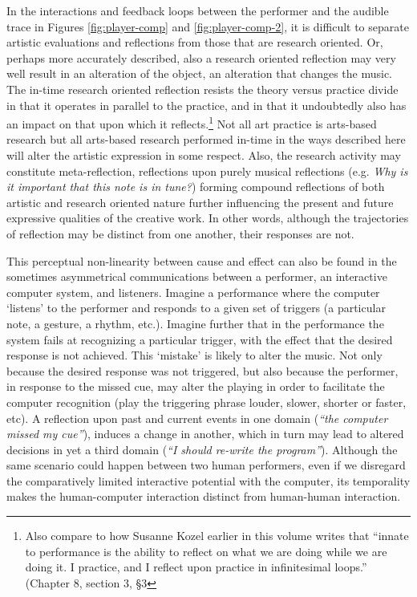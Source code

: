 In the interactions and feedback loops between the performer and the audible trace in Figures \ref{fig:player-comp} and \ref{fig:player-comp-2}, it is difficult to separate artistic evaluations and reflections from those that are research oriented. Or, perhaps more accurately described, also a research oriented reflection may very well result in an alteration of the object, an alteration that changes the music. The in-time research oriented reflection resists the theory versus practice divide in that it operates in parallel to the practice, and in that it undoubtedly also has an impact on that upon which it reflects.\footnote{Also compare to how Susanne Kozel earlier in this volume writes that ``innate to performance is the ability to reflect on what we are doing while we are doing it. I practice, and I reflect upon practice in infinitesimal loops.'' (Chapter 8, section 3, \S3} Not all art practice is arts-based research but all arts-based research performed in-time in the ways described here will alter the artistic expression in some respect. Also, the research activity may constitute meta-reflection, reflections upon purely musical reflections (e.g. \emph{Why is it important that this note is in tune?}) forming compound reflections of both artistic and research oriented nature further influencing the present and future expressive qualities of the creative work. In other words, although the trajectories of reflection may be distinct from one another, their responses are not. 

This perceptual non-linearity between cause and effect can also be found in the sometimes asymmetrical communications between a performer, an interactive computer system, and listeners. Imagine a performance where the computer `listens' to the performer and responds to a given set of triggers (a particular note, a gesture, a rhythm, etc.). Imagine further that in the performance the system fails at recognizing a particular trigger, with the effect that the desired response is not achieved. This `mistake' is likely to alter the music. Not only because the desired response was not triggered, but also because the performer, in response to the missed cue, may alter the playing in order to facilitate the computer recognition (play the triggering phrase louder, slower, shorter or faster, etc). A reflection upon past and current events in one domain (\emph{``the computer missed my cue''}), induces a change in another, which in turn may lead to altered decisions in yet a third domain (\emph{``I should re-write the program''}). Although the same scenario could happen between two human performers, even if we disregard the comparatively limited interactive potential with the computer, its temporality makes the human-computer interaction distinct from human-human interaction. 

